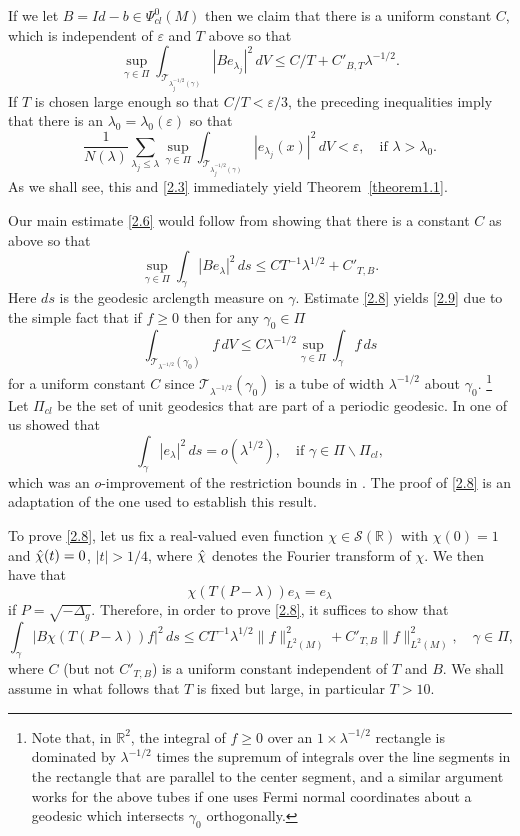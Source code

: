 \documentclass[10pt]{amsart}
\begin{document}
If we let $B=Id-b\in \Psi^0_{cl}(M)$ then we claim that there is a uniform constant
$C$, which is independent of $\varepsilon$ and $T$ above so that
\begin{equation}\label{2.6}
\sup_{\gamma\in {\varPi}}\int_{{\mathcal T}_{\lambda_j^{-1/2}(\gamma)}} |Be_{\lambda_j}|^2
\, dV\le C/T+C'_{B,T}\lambda^{-1/2}.
\end{equation}
If $T$ is chosen  large enough so that $C/T<\varepsilon/3$, the preceding inequalities
imply that there is an $\lambda_0=\lambda_0(\varepsilon)$ so that
\begin{equation}\label{2.7}
\frac1{N(\lambda)}\sum_{\lambda_j\le \lambda}\sup_{\gamma\in {\varPi}}
\int_{{\mathcal T}_{\lambda_j^{-1/2}(\gamma)}}|e_{\lambda_j}(x)|^2 \, dV
<\varepsilon, \quad \text{if } \lambda>\lambda_0.
\end{equation}
As we shall see, this and \eqref{2.3} immediately yield Theorem~\ref{theorem1.1}.

Our main estimate \eqref{2.6} would follow from showing that there is a constant
$C$ as above so that
\begin{equation}\label{2.8}
\sup_{\gamma\in {\varPi}}\int_\gamma |Be_\lambda|^2\, ds\le CT^{-1}\lambda^{1/2}+C'_{T,B}.
\end{equation}
Here $ds$ is the geodesic arclength measure on $\gamma$.
Estimate \eqref{2.8} yields \eqref{2.9} due to the simple fact
that if $f\ge0$ then for any $\gamma_0\in {\varPi}$
$$\int_{{\mathcal T}_{\lambda^{-1/2}}(\gamma_0)} f\, dV
\le C\lambda^{-1/2}\sup_{\gamma\in{\varPi}}\int_\gamma f\, ds$$
for a uniform constant $C$ since ${\mathcal T}_{\lambda^{-1/2}}(\gamma_0)$
is a tube of width $\lambda^{-1/2}$ about $\gamma_0$.
\footnote{Note that, in ${\mathbb R^2}$,
the integral of $f\ge0$ over an $1\times \lambda^{-1/2}$ rectangle is dominated
by $\lambda^{-1/2}$ times the supremum of integrals over the line
segments in the rectangle that are parallel to the center segment, and
a similar argument works for the above tubes if one uses Fermi normal
coordinates about a geodesic which intersects $\gamma_0$ orthogonally.}
 Let
${\varPi}_{cl}$ be the set of unit geodesics that are part of a
periodic geodesic. In \cite{Sokakeya} one of us showed that
$$\int_{\gamma}|e_\lambda|^2\, ds =o(\lambda^{1/2}), \quad
\text{if }\gamma\in {\varPi}\backslash {\varPi}_{cl},$$
which was an $o$-improvement of the restriction bounds in \cite{burq}.  The proof
of \eqref{2.8} is an adaptation of the one used to establish this result.

To prove \eqref{2.8}, let us fix a real-valued even function $\chi\in {\mathcal S}({\mathbb R})$
with $\chi(0)=1$ and $\Hat \chi(t)=0$, $|t|>1/4$, where $\Hat \chi$ denotes the
Fourier transform of $\chi$.  We then have that
$$\chi(T(P-\lambda))e_\lambda = e_\lambda$$
if $P=\sqrt{-\Delta_g}$.  Therefore, in order to prove \eqref{2.8}, it suffices to show that
\begin{equation}\label{2.9}
\int_\gamma |B\chi(T(P-\lambda))f|^2\, ds
\le CT^{-1}\lambda^{1/2}\|f\|^2_{L^2(M)}+C'_{T,B}\|f\|_{L^2(M)}^2,
\quad \gamma\in {\varPi},
\end{equation}
where $C$ (but not $C'_{T,B}$) is a uniform constant independent
of $T$ and $B$.  We shall assume in what follows that $T$ is fixed but large,
in particular $T>10$.
\end{document}
